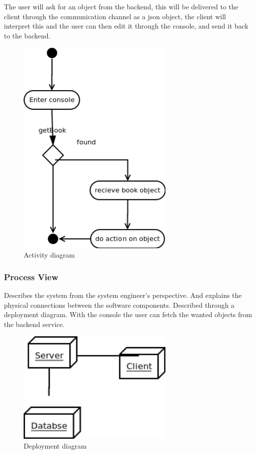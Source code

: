 The user will ask for an object from the backend, this will be delivered to the client through the communication channel as a json object, the client will interpret this and the user can then edit it through the console, and send it back to the backend.

\begin{figure}
\centering
\includegraphics[width=3in]{image/activitydiagram.png}
\caption{Activity diagram}
\end{figure}

\subsubsection{Process View}
Describes the system from the system engineer's perspective. And explains the physical connections between the software components. Described through a deployment diagram. 
With the console the user can fetch the wanted objects from the backend service.

\begin{figure}
\centering
\includegraphics[width=3in]{image/deploymentdiagram.png}
\caption{Deployment diagram}
\end{figure}

